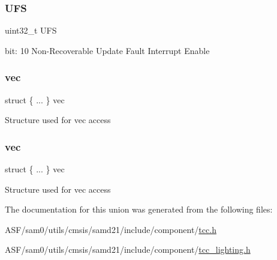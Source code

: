 \subsubsection{\texorpdfstring{UFS}{UFS}}
{\footnotesize\ttfamily uint32\+\_\+t U\+FS}

bit\+: 10 Non-\/\+Recoverable Update Fault Interrupt Enable \mbox{\label{union_t_c_c___i_n_t_e_n_s_e_t___type_a733ccd1522955a4f9ad933d7ab039844}} 
\subsubsection{\texorpdfstring{vec}{vec}\hspace{0.1cm}{\footnotesize\ttfamily [1/2]}}
{\footnotesize\ttfamily struct \{ ... \}   vec}

Structure used for vec access \mbox{\label{union_t_c_c___i_n_t_e_n_s_e_t___type_a8c49802d02cf1cf1778ef0415a808144}} 
\subsubsection{\texorpdfstring{vec}{vec}\hspace{0.1cm}{\footnotesize\ttfamily [2/2]}}
{\footnotesize\ttfamily struct \{ ... \}   vec}

Structure used for vec access 

The documentation for this union was generated from the following files\+:\begin{DoxyCompactItemize}
\item 
A\+S\+F/sam0/utils/cmsis/samd21/include/component/\mbox{\hyperlink{tcc_8h}{tcc.\+h}}\item 
A\+S\+F/sam0/utils/cmsis/samd21/include/component/\mbox{\hyperlink{tcc__lighting_8h}{tcc\+\_\+lighting.\+h}}\end{DoxyCompactItemize}
